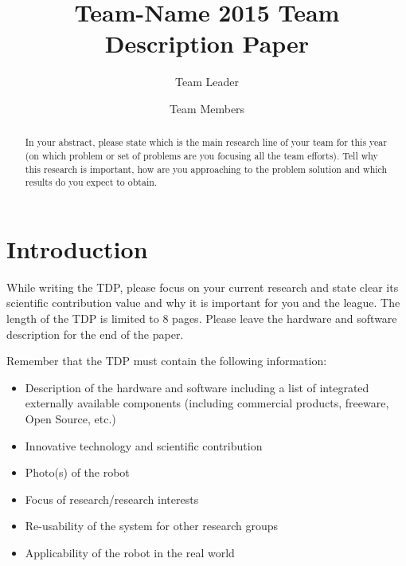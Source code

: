 \documentclass[runningheads,a4paper]{llncs}
\begin{document}
\title{Team-Name 2015 Team Description Paper}

\author{Team Leader \and Team Members }
\maketitle



\begin{abstract}

In your abstract, please state which is the main research line of your team for this year (on which problem or set of problems are you focusing all the team efforts). Tell why this research is important, how are you approaching to the problem solution and which results do you expect to obtain.

\end{abstract}



\section{Introduction}
While writing the TDP, please focus on your current research and state clear its scientific contribution value and why it is important for you and the league. The length of the TDP is limited to 8 pages. Please leave the hardware and software description for the end of the paper.

Remember that the TDP must contain the following information:

\begin{itemize}
	\item Description of the hardware and software including a list of integrated externally available components (including commercial products, freeware, Open Source, etc.)
	\item Innovative technology and scientific contribution
	\item Photo(s) of the robot
	\item Focus of research/research interests
	\item Re-usability of the system for other research groups
	\item Applicability of the robot in the real world
\end{itemize}
\end{document}
